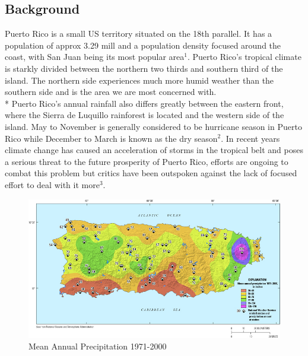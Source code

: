 \documentclass[a4paper,12pt]{article}
\begin{document}
\subsection{Background}
Puerto Rico is a small US territory situated on the 18th parallel. It has a population of approx 3.29 mill and a population density focused around the coast,
with San Juan being its most popular area$^{1}$. Puerto Rico's tropical climate is starkly divided between the northern two thirds and southern third of the island.
The northern side experiences much more humid weather than the southern side and is the area we are most concerned with.\\* Puerto Rico's annual rainfall also differs greatly between the eastern front, where the Sierra de Luquillo rainforest is located and the western side of the island.
May to November is generally considered to be hurricane season in Puerto Rico while December to March is known as the dry season$^{2}$.
In recent years climate change has caused an acceleration of storms in the tropical belt and poses a serious threat to the future prosperity of Puerto Rico, efforts are ongoing to combat this problem but critics have been outspoken against the lack
of focused effort to deal with it more$^{3}$.
\begin{figure}[h]
\centering
\includegraphics[scale =0.5]{Rainfall}
\caption{Mean Annual Precipitation 1971-2000}
\label{rainfall}
\end{figure}
\end{document}
